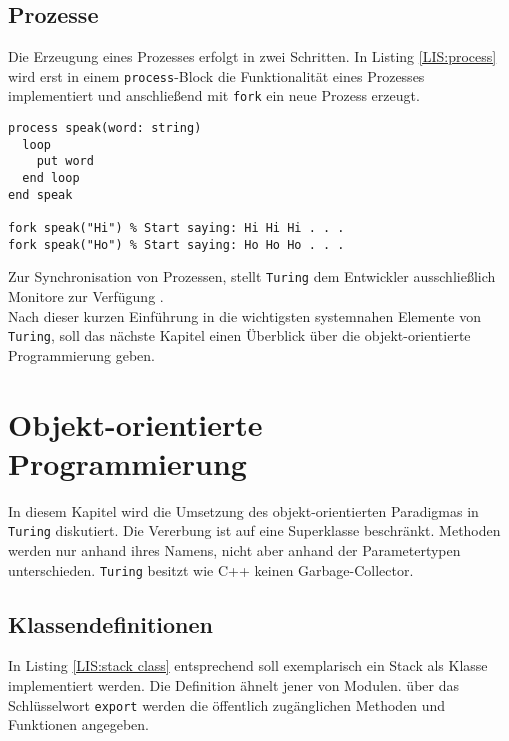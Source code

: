 \subsection{Prozesse}

Die Erzeugung eines Prozesses erfolgt in zwei Schritten. In Listing \ref{LIS:process} wird erst in einem \lstinline{process}-Block die Funktionalit\"at eines Prozesses implementiert und anschlie\ss{}end mit \lstinline{fork} ein neue Prozess erzeugt.

\lstset{label=LIS:process}
\begin{table}[h!]
\begin{lstlisting}
process speak(word: string)
  loop
    put word
  end loop
end speak

fork speak("Hi") % Start saying: Hi Hi Hi . . .
fork speak("Ho") % Start saying: Ho Ho Ho . . .
\end{lstlisting}
\end{table}

Zur Synchronisation von Prozessen, stellt \texttt{Turing} dem Entwickler ausschlie\ss{}lich Monitore zur Verf\"ugung \cite{Perelgut:88}. \\

Nach dieser kurzen Einf\"uhrung in die wichtigsten systemnahen Elemente von \texttt{Turing}, soll das n\"achste Kapitel einen \"Uberblick \"uber die objekt-orientierte Programmierung geben. 

\section{Objekt-orientierte Programmierung}
\label{chap:oop}

In diesem Kapitel wird die Umsetzung des objekt-orientierten Paradigmas in \texttt{Turing} diskutiert. Die Vererbung ist auf eine Superklasse beschr\"ankt. Methoden werden nur anhand ihres Namens, nicht aber anhand der Parametertypen unterschieden. \texttt{Turing} besitzt wie C++ keinen Garbage-Collector. 

\subsection{Klassendefinitionen}

In Listing \ref{LIS:stack class} entsprechend \cite{www:doc} soll exemplarisch ein Stack als Klasse implementiert werden. Die Definition  \"ahnelt jener von Modulen. \"uber das Schl\"usselwort \lstinline{export} werden die \"offentlich zug\"anglichen Methoden und Funktionen angegeben.

